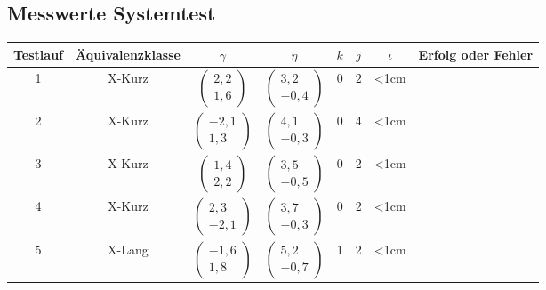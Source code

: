 \begin{appendix}
    \section{Messwerte Systemtest}
    \label{app:systest}
    \begin{center}
    	\begin{longtable}{|c|c|c|c|c|c|c|c|}
    		\hline
    		Testlauf & Äquivalenzklasse &$\gamma$ & $\eta$ & $k$ & $j$ & $\iota$ & Erfolg oder Fehler\\
    		\hline
    		\hline
    		1 & X-Kurz & $\left(\begin{array}{c} 2,2 \\ 1,6\end{array}\right)$ & $\left(\begin{array}{c} 3,2 \\ -0,4\end{array}\right)$ & $0$ & $2$ & <1cm& \checkmark\\
    		\hline
    		2 & X-Kurz &  $\left(\begin{array}{c} -2,1 \\ 1,3\end{array}\right)$ & $\left(\begin{array}{c} 4,1 \\ -0,3\end{array}\right)$ & 0 & 4 & <1cm & \checkmark\\
    		\hline
    		3 & X-Kurz &  $\left(\begin{array}{c} 1,4 \\ 2,2\end{array}\right)$ & $\left(\begin{array}{c} 3,5 \\ -0,5\end{array}\right)$ & 0 & 2& <1cm& \checkmark\\
    		\hline
    		4 & X-Kurz &  $\left(\begin{array}{c} 2,3 \\ -2,1\end{array}\right)$ & $\left(\begin{array}{c} 3,7 \\ -0,3\end{array}\right)$ & 0& 2&<1cm & \checkmark\\
    		\hline
    		5 & X-Lang &  $\left(\begin{array}{c} -1,6 \\ 1,8\end{array}\right)$ & $\left(\begin{array}{c} 5,2 \\ -0,7\end{array}\right)$ & 1& 2& <1cm& \checkmark\\

\end{longtable}
\end{center}
\end{appendix}
